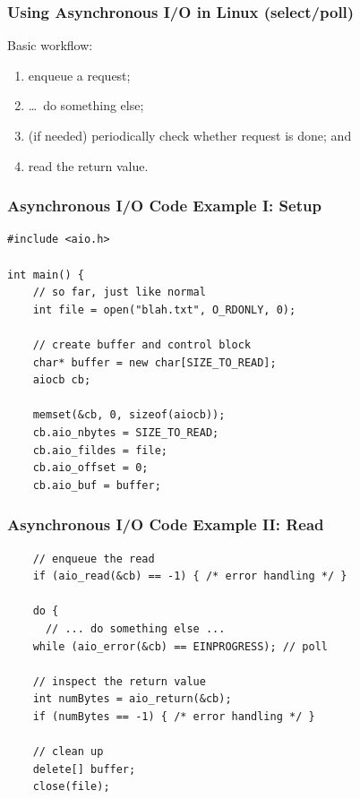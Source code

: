\begin{frame}
  \frametitle{Using Asynchronous I/O in Linux (select/poll)}


   Basic workflow: \\[1em]
   \begin{enumerate}
     \item enqueue a request;
     \item \ldots ~do something else;
     \item (if needed) periodically check whether request is done; and
     \item read the return value.
   \end{enumerate}

  
\end{frame}

\begin{frame}[fragile]
  \frametitle{Asynchronous I/O Code Example I: Setup}

  
\begin{lstlisting}
#include <aio.h>

int main() {
    // so far, just like normal
    int file = open("blah.txt", O_RDONLY, 0);

    // create buffer and control block
    char* buffer = new char[SIZE_TO_READ];
    aiocb cb;
    
    memset(&cb, 0, sizeof(aiocb));
    cb.aio_nbytes = SIZE_TO_READ;
    cb.aio_fildes = file;
    cb.aio_offset = 0;
    cb.aio_buf = buffer;
\end{lstlisting}
  

\end{frame}

\begin{frame}[fragile]
  \frametitle{Asynchronous I/O Code Example II: Read}

  
\begin{lstlisting}
    // enqueue the read
    if (aio_read(&cb) == -1) { /* error handling */ }

    do {
      // ... do something else ...
    while (aio_error(&cb) == EINPROGRESS); // poll

    // inspect the return value
    int numBytes = aio_return(&cb);
    if (numBytes == -1) { /* error handling */ }

    // clean up
    delete[] buffer;
    close(file);
\end{lstlisting}
  
\end{frame}

